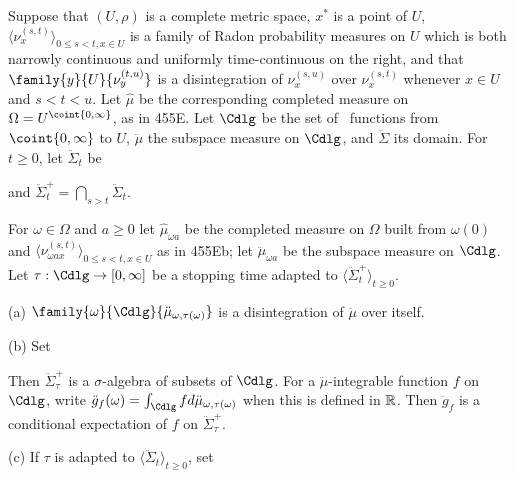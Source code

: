  Suppose that $(U,\rho)$ is a complete metric space,
$x^*$ is a point of $U$,
$\langle\nu^{(s,t)}_x\rangle_{0\le s<t,x\in U}$ is a family of Radon
probability measures on $U$ which is both narrowly continuous and uniformly
time-continuous on the right, and
that $\family{y}{U}{\nu^{(t,u)}_y}$ is a disintegration of $\nu^{(s,u)}_x$
over $\nu^{(s,t)}_x$ whenever $x\in U$ and $s<t<u$.
Let $\hat\mu$ be the
corresponding completed measure on $\Omega=U^{\coint{0,\infty}}$,
as in 455E.
Let $\Cdlg$ be the set of \cadlag\ functions from $\coint{0,\infty}$ to
$U$, $\ddot\mu$ the subspace measure on
$\Cdlg$, and $\ddot\Sigma$ its domain.   For $t\ge 0$, let $\ddot\Sigma_t$
be


\noindent and $\ddot\Sigma^+_t=\bigcap_{s>t}\ddot\Sigma_t$.

For $\omega\in\Omega$ and $a\ge 0$ let $\hat\mu_{\omega a}$ be the
completed measure on $\Omega$ built from $\omega(0)$ and
$\langle\nu^{(s,t)}_{\omega ax}\rangle_{0\le s<t,x\in U}$
as in 455Eb;  let $\ddot\mu_{\omega a}$ be the subspace measure on $\Cdlg$.
Let $\tau:\Cdlg\to[0,\infty]$ be a stopping time adapted to
$\langle\ddot\Sigma^+_t\rangle_{t\ge 0}$.

(a) $\family{\omega}{\Cdlg}{\ddot\mu_{\omega,\tau(\omega)}}$
is a disintegration of $\ddot\mu$ over itself.

(b) Set


\noindent Then $\ddot\Sigma^+_{\tau}$ is a $\sigma$-algebra of subsets of
$\Cdlg$.   For a $\ddot\mu$-integrable function
$f$ on $\Cdlg$, write
$\ddot g_f(\omega)=\int_{\Cdlg}fd\ddot\mu_{\omega,\tau(\omega)}$
when this is defined in $\Bbb R$.
Then $\ddot g_f$ is a conditional expectation of $f$ on
$\ddot\Sigma^+_{\tau}$.

(c) If $\tau$ is adapted to $\langle\ddot\Sigma_t\rangle_{t\ge 0}$, set


